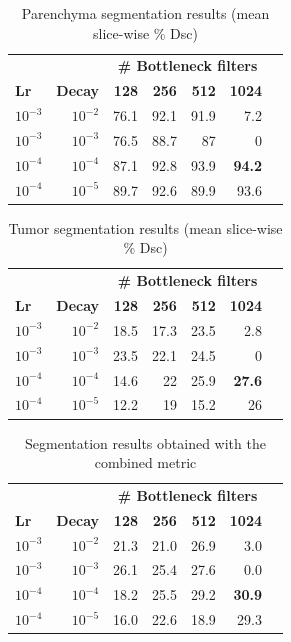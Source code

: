 \begin{table}[!htp]\centering
\caption{Parenchyma segmentation results (mean slice-wise \% Dsc)}
\scriptsize
\begin{tabular}{lrrrrrr}\toprule
& &\multicolumn{4}{c}{\textbf{\# Bottleneck filters}} \\\cmidrule{3-6}
\textbf{Lr} &\textbf{Decay} &\textbf{128} &\textbf{256} &\textbf{512} &\textbf{1024} \\\midrule
$ 10^{-3} $ &$ 10^{-2} $ &76.1 &92.1 &91.9 &7.2 \\
$ 10^{-3} $ &$ 10^{-3} $ &76.5 &88.7 &87 &0 \\
$ 10^{-4} $ &$ 10^{-4} $ &87.1 &92.8 &93.9 &\textbf{94.2} \\
$ 10^{-4} $ &$ 10^{-5} $ &89.7 &92.6 &89.9 &93.6 \\
\bottomrule
\end{tabular}
\end{table}

\begin{table}[!htp]\centering
\caption{Tumor segmentation results (mean slice-wise \% Dsc)}
\scriptsize
\begin{tabular}{lrrrrrr}\toprule
& &\multicolumn{4}{c}{\textbf{\# Bottleneck filters}} \\\cmidrule{3-6}
\textbf{Lr} &\textbf{Decay} &\textbf{128} &\textbf{256} &\textbf{512} &\textbf{1024} \\\midrule
$ 10^{-3} $ &$ 10^{-2} $ &18.5 &17.3 &23.5 &2.8 \\
$ 10^{-3} $ &$ 10^{-3} $ &23.5 &22.1 &24.5 &0 \\
$ 10^{-4} $ &$ 10^{-4} $ &14.6 &22 &25.9 &\textbf{27.6} \\
$ 10^{-4} $ &$ 10^{-5} $ &12.2 &19 &15.2 &26 \\
\bottomrule
\end{tabular}
\end{table}

\begin{table}[!htp]\centering
\caption{Segmentation results obtained with the combined metric}
\scriptsize
\begin{tabular}{lrrrrrr}\toprule
& &\multicolumn{4}{c}{\textbf{\# Bottleneck filters}} \\\cmidrule{3-6}
\textbf{Lr} &\textbf{Decay} &\textbf{128} &\textbf{256} &\textbf{512} &\textbf{1024} \\\midrule
$ 10^{-3} $ &$ 10^{-2} $ &21.3 &21.0 &26.9 &3.0 \\
$ 10^{-3} $ &$ 10^{-3} $ &26.1 &25.4 &27.6 &0.0 \\
$ 10^{-4} $ &$ 10^{-4} $ &18.2 &25.5 &29.2 &\textbf{30.9} \\
$ 10^{-4} $ &$ 10^{-5} $ &16.0 &22.6 &18.9 &29.3 \\
\bottomrule
\end{tabular}
\end{table}


